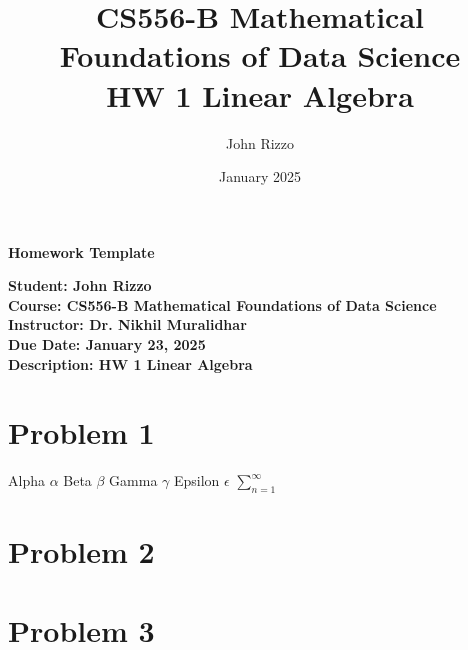 \documentclass[12pt, letterpaper]{article}
\title{CS556-B Mathematical Foundations of Data Science \\ HW 1 Linear Algebra}
\author{John Rizzo}
\date{January 2025}
\newcommand{\studentname}{John Rizzo}
\newcommand{\classname}{CS556-B Mathematical Foundations of Data Science}
\newcommand{\professorname}{Dr. Nikhil Muralidhar}
\newcommand{\assignmentdescription}{HW 1 Linear Algebra}
\newcommand{\duedate}{January 23, 2025}
\begin{document}
\begin{center}
    \Large \textbf{Homework Template} \\ [10pt]
\end{center}
\vspace{0.5cm}

\noindent
\normalsize \textbf{Student: \studentname} \\ [5pt]
\textbf{Course: \classname} \\ [5pt]
\textbf{Instructor: \professorname} \\ [5pt]
\textbf{Due Date: \duedate} \\ [5pt]
\textbf{Description: \assignmentdescription}

\vspace{0.5cm}

\section*{Problem 1}

Alpha $\alpha$
Beta $\beta$
Gamma $\gamma$
Epsilon $\epsilon$
$\sum_{n = 1}^{\infty}$

\vspace{1cm}

\section*{Problem 2}

\vspace{1cm}

\section*{Problem 3}

\vspace{1cm}

\end{document}
